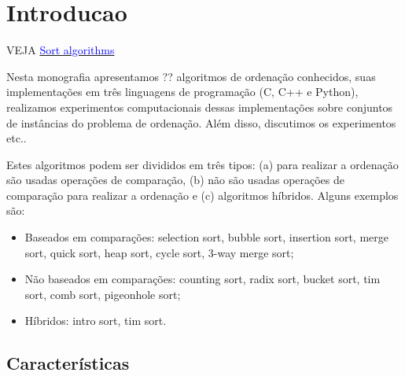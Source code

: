 \chapter{Introducao}

VEJA \href{https://en.wikipedia.org/wiki/Sorting_algorithm}{\textcolor{blue}{Sort algorithms}}

Nesta monografia apresentamos ?? algoritmos de ordenação conhecidos, suas implementações em três linguagens de programação (C, C++ e Python), realizamos experimentos computacionais dessas implementações sobre conjuntos de instâncias do problema de ordenação. Além disso, discutimos os experimentos etc..    

Estes algoritmos podem ser divididos em três tipos: (a) para realizar a ordenação são usadas operações de comparação, (b) não são usadas operações de comparação para realizar a ordenação e (c) algoritmos híbridos. Alguns exemplos são:
\begin{itemize}
    \item Baseados em comparações:  selection sort, bubble sort, insertion sort, merge sort, quick sort, heap sort, cycle sort, 3-way merge sort;

    \item Não baseados em comparações: counting sort, radix sort, bucket sort, tim sort, comb sort, pigeonhole sort;

    \item Híbridos: intro sort, tim sort.
\end{itemize}

\section{Características}

